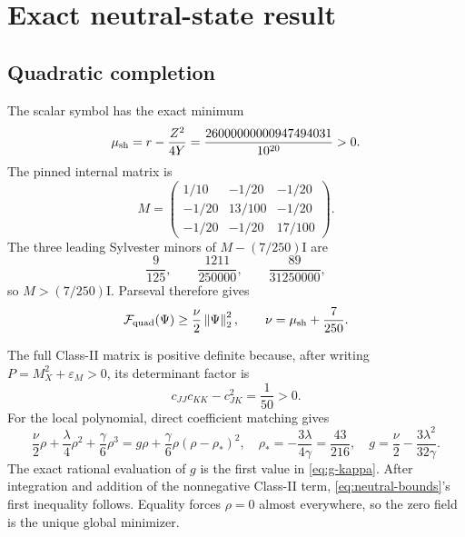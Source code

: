 \documentclass[11pt]{article}
\numberwithin{equation}{section}
\theoremstyle{definition}
\newcommand{\cF}{\mathcal F}
\newcommand{\Id}{\mathrm I}
\newcommand{\norm}[1]{\left\lVert#1\right\rVert}
\begin{document}
\section{Exact neutral-state result}
\label{sec:neutral-proof}

\subsection{Quadratic completion}

The scalar symbol has the exact minimum
\begin{equation}
 \mu_{\rm sh}=r-\frac{Z^2}{4Y}
 =\frac{26000000000947494031}{10^{20}}>0.
 \label{eq:mu-shell}
\end{equation}
The pinned internal matrix is
\begin{equation}
 M=\begin{pmatrix}
 1/10&-1/20&-1/20\\
 -1/20&13/100&-1/20\\
 -1/20&-1/20&17/100
 \end{pmatrix}.
 \label{eq:M}
\end{equation}
The three leading Sylvester minors of $M-(7/250)\Id$ are
\begin{equation}
 \frac9{125},\qquad \frac{1211}{250000},\qquad
 \frac{89}{31250000},
 \label{eq:sylvester}
\end{equation}
so $M>(7/250)\Id$.  Parseval therefore gives
\begin{equation}
 \cF_{\rm quad}(\Psi)\ge\frac\nu2\norm{\Psi}_2^2,\qquad
 \nu=\mu_{\rm sh}+\frac7{250}.
 \label{eq:nu}
\end{equation}

The full Class-II matrix is positive definite because, after writing
$P=M_X^2+\varepsilon_M>0$, its determinant factor is
\begin{equation}
 c_{JJ}c_{KK}-c_{JK}^2=\frac1{50}>0.
 \label{eq:classii-det}
\end{equation}
For the local polynomial, direct coefficient matching gives
\begin{equation}
 \frac\nu2\rho+\frac\lambda4\rho^2+\frac\gamma6\rho^3
 =g\rho+\frac\gamma6\rho(\rho-\rho_*)^2,
 \quad \rho_*=-\frac{3\lambda}{4\gamma}=\frac{43}{216},
 \quad g=\frac\nu2-\frac{3\lambda^2}{32\gamma}.
 \label{eq:neutral-completion}
\end{equation}
The exact rational evaluation of $g$ is the first value in \eqref{eq:g-kappa}.
After integration and addition of the nonnegative Class-II term,
\eqref{eq:neutral-bounds}'s first inequality follows.  Equality forces
$\rho=0$ almost everywhere, so the zero field is the unique global minimizer.
\end{document}

